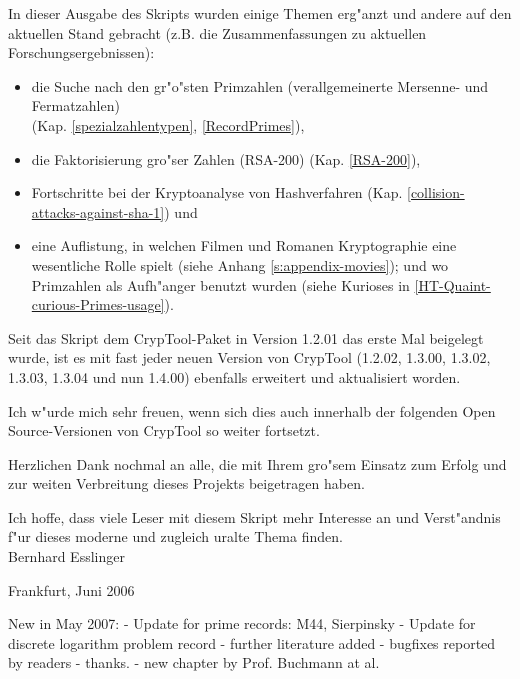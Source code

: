 In dieser Ausgabe des Skripts wurden einige Themen erg"anzt und andere auf
den aktuellen Stand gebracht (z.B. die Zusammenfassungen zu aktuellen 
Forschungsergebnissen):                   
\vspace{-7pt}
\begin{itemize}
  \item die Suche nach den gr"o"sten Primzahlen (verallgemeinerte
        Mersenne- und Fermatzahlen) \\
	(Kap. \ref{spezialzahlentypen}, \ref{RecordPrimes}),
  \item die Faktorisierung gro"ser Zahlen (RSA-200) 
        (Kap. \ref{RSA-200}),
  \item Fortschritte bei der Kryptoanalyse von Hashverfahren 
        (Kap. \ref{collision-attacks-against-sha-1}) und
  \item eine Auflistung, in welchen Filmen und Romanen Kryptographie eine
        wesentliche Rolle spielt (siehe Anhang \ref{s:appendix-movies});
        und wo Primzahlen als Aufh"anger benutzt wurden 
        (siehe Kurioses in \ref{HT-Quaint-curious-Primes-usage}).
\end{itemize}

\vspace{12pt}
Seit das Skript dem CrypTool-Paket in Version 1.2.01 das erste Mal beigelegt
wurde, ist es mit fast jeder neuen Version von CrypTool (1.2.02, 1.3.00,
1.3.02, 1.3.03, 1.3.04 und nun 1.4.00) ebenfalls erweitert und aktualisiert
worden.

Ich w"urde mich sehr freuen, wenn sich dies auch innerhalb der folgenden
Open Source-Versionen von CrypTool
so weiter fortsetzt.

Herzlichen Dank nochmal an alle, die mit Ihrem gro"sem Einsatz zum 
Erfolg und zur weiten Verbreitung dieses Projekts beigetragen haben. 

Ich hoffe, dass viele Leser mit diesem Skript mehr Interesse an und 
Verst"andnis f"ur dieses moderne und zugleich uralte Thema finden.
\\


Bernhard Esslinger

Frankfurt, Juni 2006


New in May 2007:
- Update for prime records: M44, Sierpinsky
- Update for discrete logarithm problem record
- further literature added
- bugfixes reported by readers - thanks.
- new chapter by Prof. Buchmann at al.


